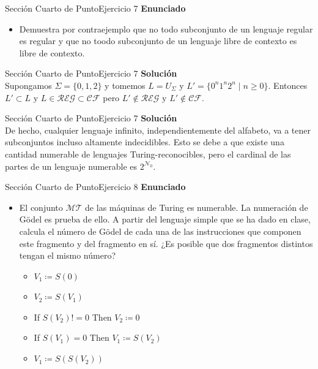 \documentclass[10pt, envcountsect, presentation, aspectratio=169]{beamer}
\newcommand{\mt}{\ensuremath{\mathcal {MT}}}
\begin{document}

\begin{frame}{Sección Cuarto de Punto}{Ejercicio 7}
\textbf{Enunciado}
	\begin{itemize}
        \item Demuestra por contraejemplo que no todo subconjunto de un lenguaje regular es regular y que no toodo subconjunto de un lenguaje libre de contexto es libre de contexto.
    \end{itemize}
\end{frame}


\begin{frame}{Sección Cuarto de Punto}{Ejercicio 7}
    \textbf{Solución}\\
    Supongamos $\Sigma = \{0,1,2\}$ y tomemos $L = U_\Sigma$ y $L'=\{0^n1^n2^n \mid n \geq 0 \}.$ Entonces $L' \subset L \text{ y } L \in \mathcal{REG} \subset \mathcal{CF}$ pero $L' \notin \mathcal{REG} \text{ y } L' \notin \mathcal{CF}.$
\end{frame}


\begin{frame}{Sección Cuarto de Punto}{Ejercicio 7}
    \textbf{Solución}\\
    De hecho, cualquier lenguaje infinito, independientemente del alfabeto, va a tener subconjuntos incluso altamente indecidibles. Esto se debe a que existe una cantidad numerable de lenguajes Turing-reconocibles, pero el cardinal de las partes de un lenguaje numerable es $2^{\mathcal{N}_0}.$
\end{frame}


\begin{frame}{Sección Cuarto de Punto}{Ejercicio 8}
    \textbf{Enunciado}
    \begin{itemize}
        \item El conjunto $\mt$ de las máquinas de Turing es numerable. La numeración de Gödel es prueba de ello. A partir del lenguaje simple que se ha dado en clase, calcula el número de Gödel de cada una de las instrucciones que componen este fragmento y del fragmento en sí. ¿Es posible que dos fragmentos distintos tengan el mismo número?
        \begin{itemize}
            \item[] $V_1 \coloneqq S(0)$
            \item[] $V_2 \coloneqq S(V_1)$
            \item[] If $S(V_2)!=0$ Then $V_2 \coloneqq0$
            \item[] If $S(V_1)=0$ Then $V_1 \coloneqq S(V_2)$
            \item[] $V_1 \coloneqq S(S(V_2))$
        \end{itemize}
    \end{itemize}
\end{frame}
\end{document}
